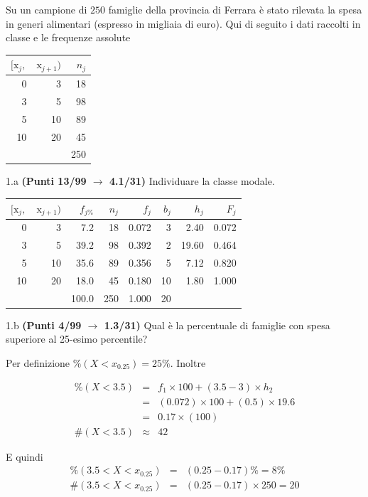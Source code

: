 \documentclass[
  11pt,
]{book}
\theoremstyle{mytheoremstyle}
\theoremstyle{mydefstyle}
\newenvironment{sol}
  {
  \begin{tcolorbox}[enhanced,breakable,arc=0.1mm,boxrule=1pt,colback=white,colframe=iblue,
  title=\bf \fontfamily{lmss}\selectfont \hspace{.5 cm} Soluzione,drop fuzzy shadow]

}{
\end{tcolorbox}
  }
\begin{document}
Su un campione di \(250\) famiglie della provincia di Ferrara è stato rilevata la spesa in generi alimentari (espresso in migliaia di euro). Qui di seguito i dati raccolti in classe e le frequenze assolute

\begin{table}[H]
\centering
\begin{tabular}{rrr}
\toprule
$[\text{x}_j,$ & $\text{x}_{j+1})$ & $n_j$\\
\midrule
0 & 3 & 18\\
3 & 5 & 98\\
5 & 10 & 89\\
10 & 20 & 45\\
 &  & 250\\
\bottomrule
\end{tabular}
\end{table}

1.a \textbf{(Punti 13/99 \(\rightarrow\) 4.1/31)} Individuare la classe modale.

\begin{sol}

\begin{table}[H]
\centering
\begin{tabular}{rrrrrrrr}
\toprule
$[\text{x}_j,$ & $\text{x}_{j+1})$ & $f_{j\%}$ & $n_j$ & $f_j$ & $b_j$ & $h_j$ & $F_j$\\
\midrule
0 & 3 & 7.2 & 18 & 0.072 & 3 & 2.40 & 0.072\\
3 & 5 & 39.2 & 98 & 0.392 & 2 & 19.60 & 0.464\\
5 & 10 & 35.6 & 89 & 0.356 & 5 & 7.12 & 0.820\\
10 & 20 & 18.0 & 45 & 0.180 & 10 & 1.80 & 1.000\\
 &  & 100.0 & 250 & 1.000 & 20 &  & \\
\bottomrule
\end{tabular}
\end{table}

\end{sol}

1.b \textbf{(Punti 4/99 \(\rightarrow\) 1.3/31)} Qual è la percentuale di famiglie con spesa superiore al 25-esimo percentile?

\begin{sol}
Per definizione \(\%(X<x_{ 0.25 })= 25 \%\). Inoltre

\begin{eqnarray*}
   \%(X< 3.5 ) &=&  f_{ 1 }\times 100 +( 3.5 - 3 )\times h_{ 2 } \\
                &=&  ( 0.072 )\times 100 +( 0.5 )\times  19.6  \\
                &=&  0.17 \times(100) \\
\#(X< 3.5 )    &\approx& 42 
\end{eqnarray*}

E quindi
\begin{eqnarray*}
   \%( 3.5 < X < x_{0.25} ) &=& ( 0.25 - 0.17 )\%= 8 \% \\
   \#( 3.5 < X < x_{0.25} ) &=& ( 0.25 - 0.17 )\times  250 = 20  \\
\end{eqnarray*}

\end{sol}
\end{document}
